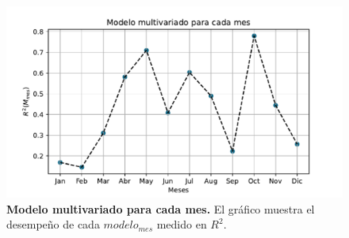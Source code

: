 \begin{figure}[htp!]
\centering
\includegraphics[width=1\textwidth]{img/modelomeses.pdf}
\caption{\textbf{Modelo multivariado para cada mes.} El gráfico muestra el desempeño de cada \textit{$modelo_{mes}$} medido en $R^{2}$.}
\label{fig:10}
\end{figure}

\newpage




